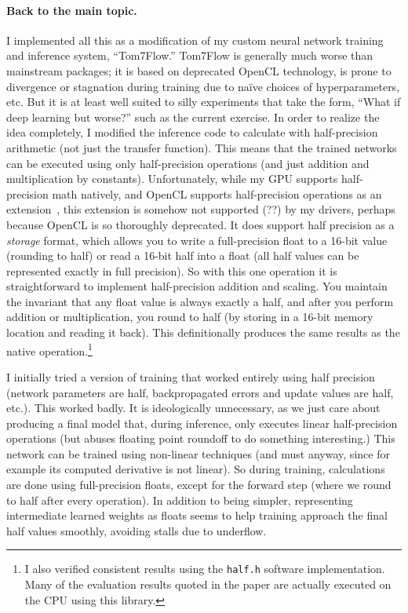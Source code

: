 \documentclass[twocolumn]{article}
\begin{document}
\paragraph{Back to the main topic.}
I implemented all this as a modification of my custom neural network
training and inference system, ``Tom7Flow.'' Tom7Flow is generally
much worse than mainstream packages; it is based on deprecated OpenCL
technology, is prone to divergence or stagnation during training due
to na\"ive choices of hyperparameters, etc. But it is at least well
suited to silly experiments that take the form, ``What if deep
learning but worse?'' such as the current exercise. In order to
realize the idea completely, I modified the inference code to
calculate with half-precision arithmetic (not just the transfer
function). This means that the trained networks can be executed using
only half-precision operations (and just addition and multiplication
by constants). Unfortunately, while my GPU supports half-precision
math natively, and OpenCL supports half-precision operations as an
extension~\cite{openclextensions}, this extension is somehow not
supported (??) by my drivers, perhaps because OpenCL is so thoroughly
deprecated. It does support half precision as a {\em storage} format,
which allows you to write a full-precision float to a 16-bit value
(rounding to half) or read a 16-bit half into a float (all half values
can be represented exactly in full precision). So with this one
operation it is straightforward to implement half-precision addition
and scaling. You maintain the invariant that any float value is always
exactly a half, and after you perform addition or multiplication, you
round to half (by storing in a 16-bit memory location and reading it
back). This definitionally produces the same results as the native
operation.\footnote{I also verified consistent results using the
  \verb+half.h+ software implementation. Many of the evaluation
  results quoted in the paper are actually executed on the CPU using
  this library.}

I initially tried a version of training that worked entirely using
half precision (network parameters are half, backpropagated errors and
update values are half, etc.). This worked badly. It is ideologically
unnecessary, as we just care about producing a final model that,
during inference, only executes linear half-precision operations (but
abuses floating point roundoff to do something interesting.) This
network can be trained using non-linear techniques (and must anyway,
since for example its computed derivative is not linear). So during
training, calculations are done using full-precision floats, except
for the forward step (where we round to half after every operation).
In addition to being simpler, representing intermediate learned
weights as floats seems to help training approach the final half
values smoothly, avoiding stalls due to underflow.
\end{document}
